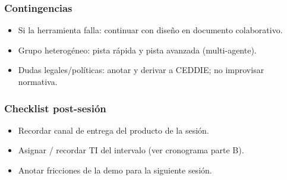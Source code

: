 \subsubsection*{Contingencias}
\begin{itemize}
\item Si la herramienta falla: continuar con diseño en documento colaborativo.
\item Grupo heterogéneo: pista rápida y pista avanzada (multi-agente).
\item Dudas legales/políticas: anotar y derivar a CEDDIE; no improvisar normativa.
\end{itemize}

\subsubsection*{Checklist post-sesión}
\begin{itemize}
\item[$\square$] Recordar canal de entrega del producto de la sesión.
\item[$\square$] Asignar / recordar TI del intervalo (ver cronograma parte B).
\item[$\square$] Anotar fricciones de la demo para la siguiente sesión.
\end{itemize}
